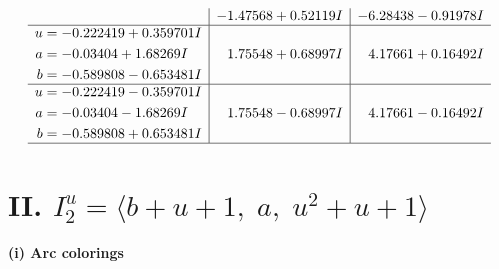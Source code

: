 \documentclass[1p]{elsarticle_modified}
\theoremstyle{definition}
\begin{document}
$$\begin{array}{c|c|c}
 & -1.47568 + 0.52119 I & -6.28438 - 0.91978 I \\ \hline\begin{aligned}
u &= -0.222419 + 0.359701 I \\
a &= -0.03404 + 1.68269 I \\
b &= -0.589808 - 0.653481 I\end{aligned}
 & \phantom{-}1.75548 + 0.68997 I & \phantom{-}4.17661 + 0.16492 I \\ \hline\begin{aligned}
u &= -0.222419 - 0.359701 I \\
a &= -0.03404 - 1.68269 I \\
b &= -0.589808 + 0.653481 I\end{aligned}
 & \phantom{-}1.75548 - 0.68997 I & \phantom{-}4.17661 - 0.16492 I\\
 \hline 
 \end{array}$$\newpage\newpage\renewcommand{\arraystretch}{1}
\centering \section*{II. $I^u_{2}= \langle b+u+1,\;a,\;u^2+u+1 \rangle$}
\flushleft \textbf{(i) Arc colorings}\\
\end{document}
